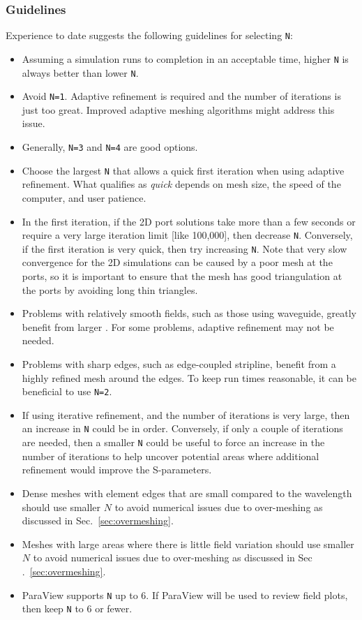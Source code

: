\documentclass[titlepage]{article}
\renewcommand\_{\textunderscore\linebreak[1]}
\begin{document}
\subsubsection{Guidelines}

Experience to date suggests the following guidelines for selecting \texttt{N}:
\begin{itemize}
\item Assuming a simulation runs to completion in an acceptable time, higher \texttt{N} is always better than lower \texttt{N}.
\item Avoid \texttt{N=1}.  Adaptive refinement is required and the number of iterations is just too great.  Improved adaptive meshing algorithms might address this issue.
\item Generally, \texttt{N=3} and \texttt{N=4} are good options.
\item Choose the largest \texttt{N} that allows a quick first iteration when using adaptive refinement.  What qualifies as \textit{quick} depends on mesh size, the speed of the computer, and user patience.
\item In the first iteration, if the 2D port solutions take more than a few seconds or require a very large iteration limit [like 100,000], then decrease \texttt{N}.  Conversely, if the first iteration is very quick, then try increasing \texttt{N}.  Note that very slow convergence for the 2D simulations can be caused by a poor mesh at the ports, so it is important to ensure that the mesh has good triangulation at the ports by avoiding long thin triangles.
\item Problems with relatively smooth fields, such as those using waveguide, greatly benefit from larger .  For some problems, adaptive refinement may not be needed.
\item Problems with sharp edges, such as edge-coupled stripline, benefit from a highly refined mesh around the edges.  To keep run times reasonable, it can be beneficial to use \texttt{N=2}.
\item If using iterative refinement, and the number of iterations is very large, then an increase in \texttt{N} could be in order.  Conversely, if only a couple of iterations are needed, then a smaller \texttt{N} could be useful to force an increase in the number of iterations to help uncover potential areas where additional refinement would improve the S-parameters.
\item Dense meshes with element edges that are small compared to the wavelength should use smaller $N$ to avoid numerical issues due to over-meshing as discussed in Sec.~\ref{sec:overmeshing}.
\item Meshes with large areas where there is little field variation should use smaller $N$ to avoid numerical issues due to over-meshing as discussed in Sec
.~\ref{sec:overmeshing}.
\item ParaView supports \texttt{N} up to 6.  If ParaView will be used to review field plots, then keep \texttt{N} to 6 or fewer.
\end{itemize}
\end{document}
